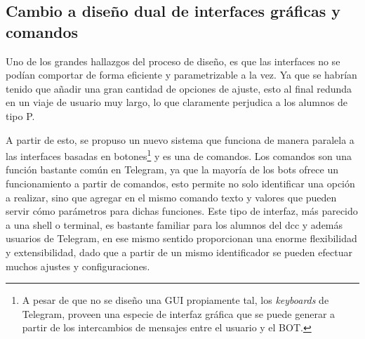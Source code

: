     \subsection{Cambio a diseño dual de interfaces gráficas y comandos}
    \par Uno de los grandes hallazgos del proceso de diseño, es que las interfaces no se podían comportar de forma eficiente y parametrizable a la vez. Ya que se habrían tenido que añadir una gran cantidad de opciones de ajuste, esto al final redunda en un viaje de usuario muy largo, lo que claramente perjudica a los alumnos de tipo P.

    \par A partir de esto, se propuso un nuevo sistema que funciona de manera paralela a las interfaces basadas en botones\footnote{A pesar de que no se diseño una GUI propiamente tal, los \textit{keyboards} de \gls{Telegram}, proveen una especie de interfaz gráfica que se puede generar a partir de los intercambios de mensajes entre el usuario y el BOT.} y es una de comandos.
    Los comandos son una función bastante común en Telegram, ya que la mayoría de los bots ofrece un funcionamiento a partir de comandos, esto permite no solo identificar una opción a realizar, sino que agregar en el mismo comando texto y valores que pueden servir cómo parámetros para dichas funciones. Este tipo de interfaz, más parecido a una shell o terminal, es bastante familiar para los alumnos del dcc y además usuarios de Telegram, en ese mismo sentido proporcionan una enorme flexibilidad y extensibilidad, dado que a partir de un mismo identificador se pueden efectuar muchos ajustes y configuraciones.



